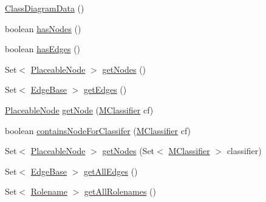 \begin{DoxyCompactItemize}
\item 
\hyperlink{classorg_1_1tzi_1_1use_1_1gui_1_1views_1_1diagrams_1_1classdiagram_1_1_class_diagram_data_a2b2b2de0b3c653939e38244459a8ab15}{Class\-Diagram\-Data} ()
\item 
boolean \hyperlink{classorg_1_1tzi_1_1use_1_1gui_1_1views_1_1diagrams_1_1classdiagram_1_1_class_diagram_data_a8ac41d1b427978f86a0ff6cde9c1f73a}{has\-Nodes} ()
\item 
boolean \hyperlink{classorg_1_1tzi_1_1use_1_1gui_1_1views_1_1diagrams_1_1classdiagram_1_1_class_diagram_data_a489dbcb717c2cc3e8c5c8d25fca8fe00}{has\-Edges} ()
\item 
Set$<$ \hyperlink{classorg_1_1tzi_1_1use_1_1gui_1_1views_1_1diagrams_1_1elements_1_1_placeable_node}{Placeable\-Node} $>$ \hyperlink{classorg_1_1tzi_1_1use_1_1gui_1_1views_1_1diagrams_1_1classdiagram_1_1_class_diagram_data_a376e054eef1f56d88f557cf7a66ebf13}{get\-Nodes} ()
\item 
Set$<$ \hyperlink{classorg_1_1tzi_1_1use_1_1gui_1_1views_1_1diagrams_1_1elements_1_1edges_1_1_edge_base}{Edge\-Base} $>$ \hyperlink{classorg_1_1tzi_1_1use_1_1gui_1_1views_1_1diagrams_1_1classdiagram_1_1_class_diagram_data_a3c1a8ba8480407224cae52c8a7d1c96b}{get\-Edges} ()
\item 
\hyperlink{classorg_1_1tzi_1_1use_1_1gui_1_1views_1_1diagrams_1_1elements_1_1_placeable_node}{Placeable\-Node} \hyperlink{classorg_1_1tzi_1_1use_1_1gui_1_1views_1_1diagrams_1_1classdiagram_1_1_class_diagram_data_a0285facb4933298eb243008b6ef4463d}{get\-Node} (\hyperlink{interfaceorg_1_1tzi_1_1use_1_1uml_1_1mm_1_1_m_classifier}{M\-Classifier} cf)
\item 
boolean \hyperlink{classorg_1_1tzi_1_1use_1_1gui_1_1views_1_1diagrams_1_1classdiagram_1_1_class_diagram_data_a237e022dae1cef3b7edbc309d2feff6b}{contains\-Node\-For\-Classifer} (\hyperlink{interfaceorg_1_1tzi_1_1use_1_1uml_1_1mm_1_1_m_classifier}{M\-Classifier} cf)
\item 
Set$<$ \hyperlink{classorg_1_1tzi_1_1use_1_1gui_1_1views_1_1diagrams_1_1elements_1_1_placeable_node}{Placeable\-Node} $>$ \hyperlink{classorg_1_1tzi_1_1use_1_1gui_1_1views_1_1diagrams_1_1classdiagram_1_1_class_diagram_data_a0a537374a16ad24f7a476888bc168aad}{get\-Nodes} (Set$<$ \hyperlink{interfaceorg_1_1tzi_1_1use_1_1uml_1_1mm_1_1_m_classifier}{M\-Classifier} $>$ classifier)
\item 
Set$<$ \hyperlink{classorg_1_1tzi_1_1use_1_1gui_1_1views_1_1diagrams_1_1elements_1_1edges_1_1_edge_base}{Edge\-Base} $>$ \hyperlink{classorg_1_1tzi_1_1use_1_1gui_1_1views_1_1diagrams_1_1classdiagram_1_1_class_diagram_data_a9bb2fde52286386de91f49f8b616f3bb}{get\-All\-Edges} ()
\item 
Set$<$ \hyperlink{classorg_1_1tzi_1_1use_1_1gui_1_1views_1_1diagrams_1_1elements_1_1_rolename}{Rolename} $>$ \hyperlink{classorg_1_1tzi_1_1use_1_1gui_1_1views_1_1diagrams_1_1classdiagram_1_1_class_diagram_data_ac712047c1bd31c9bd8c3e6258751f0d5}{get\-All\-Rolenames} ()
\end{DoxyCompactItemize}
